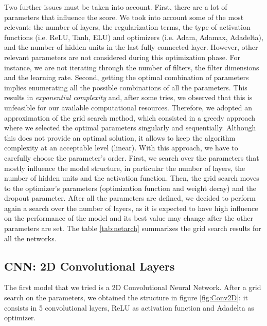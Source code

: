 \documentclass[10pt,conference,compsocconf]{IEEEtran}
\begin{document}
Two further issues must be taken into account. First, there are a lot of parameters that influence the score. We took into account some of the most relevant: the number of layers, the regularization terms, the type of activation functions (i.e. ReLU, Tanh, ELU) and optimizers (i.e. Adam, Adamax, Adadelta), and the number of hidden units in the last fully connected layer. However, other relevant parameters are not considered during this optimization phase. For instance, we are not iterating through the number of filters, the filter dimensions and the learning rate. Second, getting the optimal combination of parameters implies enumerating all the possible combinations of all the parameters. This results in \textit{exponential complexity} and, after some tries, we observed that this is unfeasible for our available computational resources. Therefore, we adopted an approximation of the grid search method, which consisted in a greedy approach where we selected the optimal parameters singularly and sequentially. Although this does not provide an optimal solution, it allows to keep the algorithm complexity at an acceptable level (linear). With this approach, we have to carefully choose the parameter's order. First, we search over the parameters that mostly influence the model structure, in particular the number of layers, the number of hidden units and the activation function. Then, the grid search moves to the optimizer's parameters (optimization function and weight decay) and the dropout parameter. After all the parameters are defined, we decided to perform again a search over the number of layers, as it is expected to have high influence on the performance of the model and its best value may change after the other parameters are set.
The table \ref{tab:netarch} summarizes the grid search results for all the networks.

\subsection{CNN: 2D Convolutional Layers}
The first model that we tried is a 2D Convolutional Neural Network. After a grid search on the parameters, we obtained the structure in figure \ref{fig:Conv2D}: it consists in 5 convolutional layers, ReLU as activation function and Adadelta as optimizer.
\end{document}
